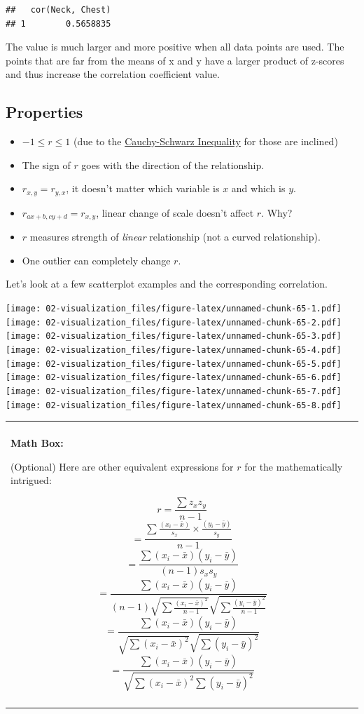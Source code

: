 \documentclass[
]{book}
\newenvironment{mathbox}
{
    \begin{center}
    
    \begin{tabular}{|p{0.8\textwidth}|}
    \rowcolor{LightYellow}
    \hline\\
    \rowcolor{LightYellow}
    \textbf{Math Box:}
}
{
    \\\rowcolor{LightYellow}
    \\\hline
    \end{tabular} 
    \end{center}
}
\begin{document}
\begin{verbatim}
##   cor(Neck, Chest)
## 1        0.5658835
\end{verbatim}

The value is much larger and more positive when all data points are used. The points that are far from the means of x and y have a larger product of z-scores and thus increase the correlation coefficient value.

\hypertarget{properties}{%
\subsection{Properties}\label{properties}}

\begin{itemize}
\item
  \(-1 \leq r \leq 1\) (due to the \href{https://en.wikipedia.org/wiki/Cauchy\%E2\%80\%93Schwarz_inequality}{Cauchy-Schwarz Inequality} for those are inclined)
\item
  The sign of \(r\) goes with the direction of the relationship.
\item
  \(r_{x,y} = r_{y,x}\), it doesn't matter which variable is \(x\) and which is \(y\).
\item
  \(r_{ax+b, cy+d} = r_{x,y}\), linear change of scale doesn't affect \(r\). Why?
\item
  \(r\) measures strength of \emph{linear} relationship (not a curved relationship).
\item
  One outlier can completely change \(r\).
\end{itemize}

Let's look at a few scatterplot examples and the corresponding correlation.

\texttt{[image: 02-visualization\_files/figure-latex/unnamed-chunk-65-1.pdf]} \texttt{[image: 02-visualization\_files/figure-latex/unnamed-chunk-65-2.pdf]} \texttt{[image: 02-visualization\_files/figure-latex/unnamed-chunk-65-3.pdf]} \texttt{[image: 02-visualization\_files/figure-latex/unnamed-chunk-65-4.pdf]} \texttt{[image: 02-visualization\_files/figure-latex/unnamed-chunk-65-5.pdf]} \texttt{[image: 02-visualization\_files/figure-latex/unnamed-chunk-65-6.pdf]} \texttt{[image: 02-visualization\_files/figure-latex/unnamed-chunk-65-7.pdf]} \texttt{[image: 02-visualization\_files/figure-latex/unnamed-chunk-65-8.pdf]}

\begin{mathbox}
(Optional) Here are other equivalent expressions for \(r\) for the
mathematically intrigued:

\[ r = \frac{\sum z_x z_y}{n-1}  \]
\[ = \frac{\sum{\frac{(x_i-\bar{x})}{s_x}\times\frac{(y_i-\bar{y})}{s_y}}}{n-1}\]
\[= \frac{\sum{(x_i-\bar{x})(y_i-\bar{y})}}{(n-1) s_x s_y}\]
\[= \frac{\sum{(x_i-\bar{x})(y_i-\bar{y})}}{(n-1)\sqrt{\sum{\frac{(x_i-\bar{x})^2}{n-1}}}\sqrt{\sum{\frac{(y_i-\bar{y})^2}{n-1}}}}\]
\[=\frac{\sum{(x_i-\bar{x})(y_i-\bar{y})}}{\sqrt{\sum{(x_i-\bar{x})^2}}\sqrt{\sum{(y_i-\bar{y})^2}}}\]
\[=\frac{\sum{(x_i-\bar{x})(y_i-\bar{y})}}{\sqrt{\sum{(x_i-\bar{x})^2\sum{(y_i-\bar{y})^2}}}}\]
\end{mathbox}
\end{document}
